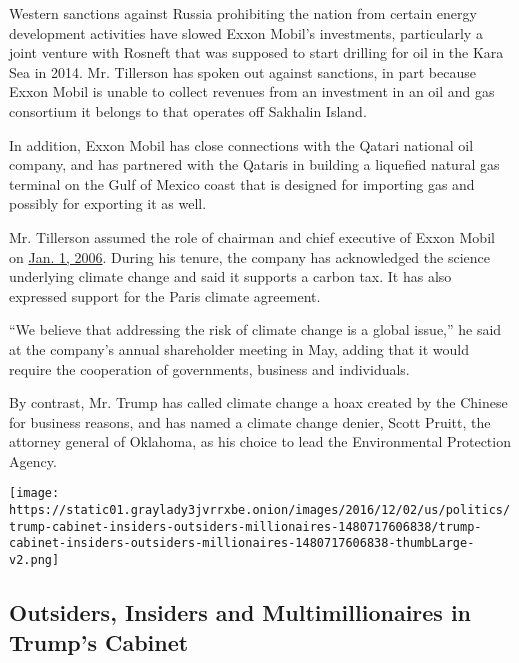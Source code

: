 Western sanctions against Russia prohibiting the nation from certain
energy development activities have slowed Exxon Mobil's investments,
particularly a joint venture with Rosneft that was supposed to start
drilling for oil in the Kara Sea in 2014. Mr. Tillerson has spoken out
against sanctions, in part because Exxon Mobil is unable to collect
revenues from an investment in an oil and gas consortium it belongs to
that operates off Sakhalin Island.

In addition, Exxon Mobil has close connections with the Qatari national
oil company, and has partnered with the Qataris in building a liquefied
natural gas terminal on the Gulf of Mexico coast that is designed for
importing gas and possibly for exporting it as well.

Mr. Tillerson assumed the role of chairman and chief executive of Exxon
Mobil on
\href{http://corporate.exxonmobil.com/en/company/about-us/management/rex-w-tillerson}{Jan.
1, 2006}. During his tenure, the company has acknowledged the science
underlying climate change and said it supports a carbon tax. It has also
expressed support for the Paris climate agreement.

``We believe that addressing the risk of climate change is a global
issue,'' he said at the company's annual shareholder meeting in May,
adding that it would require the cooperation of governments, business
and individuals.

By contrast, Mr. Trump has called climate change a hoax created by the
Chinese for business reasons, and has named a climate change denier,
Scott Pruitt, the attorney general of Oklahoma, as his choice to lead
the Environmental Protection Agency.

\href{https://www.nytimes3xbfgragh.onion/interactive/2016/12/05/us/politics/trump-cabinet-insiders-outsiders-millionaires.html}{}

\texttt{[image: https://static01.graylady3jvrrxbe.onion/images/2016/12/02/us/politics/trump-cabinet-insiders-outsiders-millionaires-1480717606838/trump-cabinet-insiders-outsiders-millionaires-1480717606838-thumbLarge-v2.png]}

\hypertarget{outsiders-insiders-and-multimillionaires-in-trumps-cabinet}{%
\subsection{Outsiders, Insiders and Multimillionaires in Trump's
Cabinet}\label{outsiders-insiders-and-multimillionaires-in-trumps-cabinet}}

